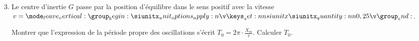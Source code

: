 \begin{enumerate}
    \setcounter{enumi}{2}
    \item Le centre d'inertie $G$ passe par la position d'équilibre dans le sens
          positif avec la vitesse $v=\qty{0,25}{\v}$.

          Montrer que l'expression de la période propre des oscillations s'écrit
          $T_{0}=2\pi\cdot\frac{X_{m}}{v}$. Calculer $T_{0}$.
\end{enumerate}

